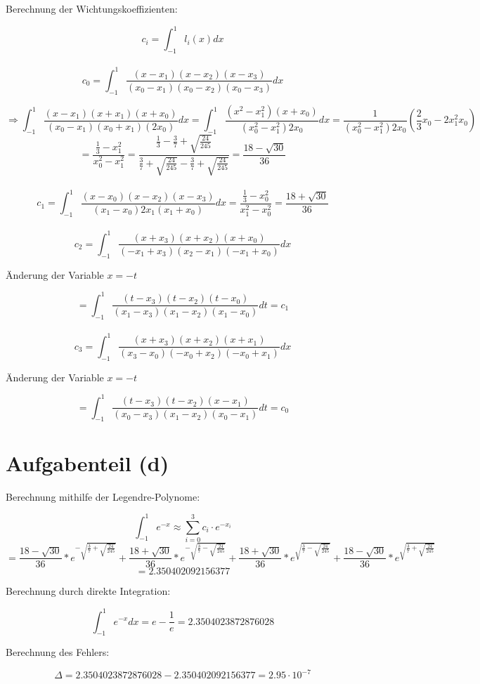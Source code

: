 \documentclass{scrreprt}
\begin{document}
Berechnung der Wichtungskoeffizienten:

\[
c_i = \int_{-1}^{1} l_i(x)dx
\]
\\
\[
c_0 = \int_{-1}^{1} \frac{(x-x_1)(x-x_2)(x-x_3)}{(x_0-x_1)(x_0-x_2)(x_0-x_3)}dx
\]

\[
\Rightarrow \int_{-1}^{1} \frac{(x-x_1)(x+x_1)(x+x_0)}{(x_0-x_1)(x_0+x_1)(2x_0)}dx = \int_{-1}^{1}\frac{(x^2-x_1^2)(x+x_0)}{(x_0^2 - x_1^2)2x_0}dx = \frac{1}{(x_0^2-x_1^2)2x_0} (\frac{2}{3}x_0 - 2x_1^2x_0)
\]
\[
=\frac{\frac{1}{3}-x_1^2}{x_0^2 - x_1^2}
=\frac{\frac{1}{3}-\frac{3}{7}+\sqrt{\frac{24}{245}}}{\frac{3}{7}+\sqrt{\frac{24}{245}}-\frac{3}{7}+\sqrt{\frac{24}{245}}} = \frac{18-\sqrt{30}}{36}
\]
\\
\[
c_1 = \int_{-1}^{1} \frac{(x-x_0)(x-x_2)(x-x_3)}{(x_1-x_0)2x_1(x_1+x_0)}dx = \frac{\frac{1}{3}-x_0^2}{x_1^2-x_0^2}=\frac{18+\sqrt{30}}{36}
\]
\\
\[
c_2 = \int_{-1}^{1} \frac{(x+x_3)(x+x_2)(x+x_0)}{(-x_1+x_3)(x_2-x_1)(-x_1+x_0)}dx
\]

Änderung der Variable $x=-t$

\[
= \int_{-1}^{1} \frac{(t-x_3)(t-x_2)(t-x_0)}{(x_1-x_3)(x_1-x_2)(x_1-x_0)}dt = c_1
\]
\\
\[
c_3 = \int_{-1}^{1}\frac{(x+x_3)(x+x_2)(x+x_1)}{(x_3-x_0)(-x_0+x_2)(-x_0+x_1)} dx
\]

Änderung der Variable $x=-t$

\[
= \int_{-1}^{1}\frac{(t-x_3)(t-x_2)(x-x_1)}{(x_0-x_3)(x_1-x_2)(x_0-x_1)}dt = c_0
\]

\section{Aufgabenteil (d)}

Berechnung mithilfe der Legendre-Polynome:

\[
\int_{-1}^{1}e^{-x} \approx \sum_{i=0}^{3} c_i\cdot e^{-x_i}
\]
\[
= \frac{18-\sqrt{30}}{36}*e^{-\sqrt{\frac{3}{7}+\sqrt{\frac{24}{245}}}}
+\frac{18+\sqrt{30}}{36}*e^{-\sqrt{\frac{3}{7}-\sqrt{\frac{24}{245}}}}
+\frac{18+\sqrt{30}}{36}*e^{\sqrt{\frac{3}{7}-\sqrt{\frac{24}{245}}}}
+\frac{18-\sqrt{30}}{36}*e^{\sqrt{\frac{3}{7}+\sqrt{\frac{24}{245}}}}
\]
\[
=2.350402092156377
\]

Berechnung durch direkte Integration:

\[
\int_{-1}^{1} e^{-x}dx = e-\frac{1}{e}=2.3504023872876028
\]

Berechnung des Fehlers:

\[
\Delta = 2.3504023872876028-2.350402092156377 = 2.95\cdot 10^{-7}
\]
\end{document}
